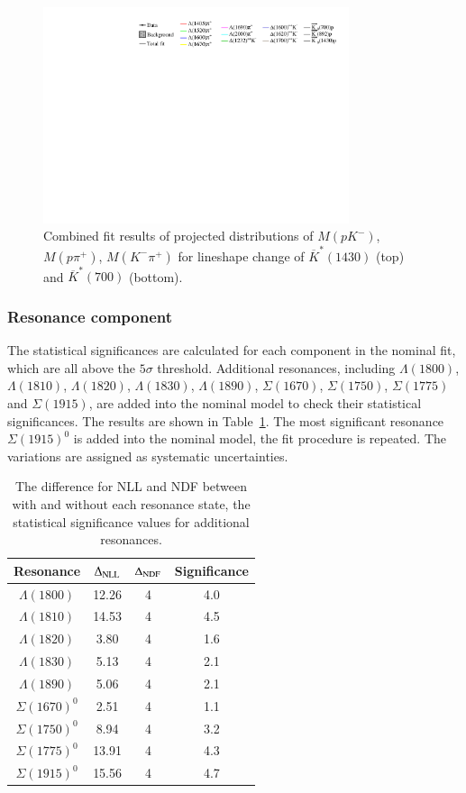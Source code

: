 \begin{figure}[htbp]
    \includegraphics[width=0.80\textwidth]{figure/pwa_nominal/legend.pdf}

    \caption{Combined fit results of projected distributions of $M(pK^-)$, $M(p\pi^+)$, $M(K^-\pi^+)$ for lineshape change of $\overline{K}^*(1430)$ (top) and $\overline{K}^*(700)$ (bottom). }
\label{fig:pwa_lineshape}
\end{figure}

\subsubsection{Resonance component}
\label{sec:syst_component}
The statistical significances are calculated for each component in the nominal fit, which are all above the $5\sigma$ threshold. Additional resonances, including $\Lambda(1800)$, $\Lambda(1810)$, $\Lambda(1820)$, $\Lambda(1830)$, $\Lambda(1890)$, $\Sigma(1670)$, $\Sigma(1750)$, $\Sigma(1775)$ and $\Sigma(1915)$, are added into the nominal model to check their statistical significances. The results are shown in Table~\ref{tab:add_significance}. The most significant resonance $\Sigma(1915)^0$ is added into the nominal model, the fit procedure is repeated. The variations are assigned as systematic uncertainties. 
\begin{table}[h]
    \centering
    \caption{The difference for NLL and NDF between with and without each resonance state, the statistical significance values for additional resonances.}
    \label{tab:add_significance}
    \begin{tabular}{cccc}
        \hline\hline
    Resonance & $\Delta_{\rm NLL}$ & $\Delta_{\rm NDF}$ & Significance \\\hline
    $\Lambda(1800)$ & 12.26 & 4 & 4.0\\
    $\Lambda(1810)$ & 14.53 & 4 & 4.5\\
    $\Lambda(1820)$ & 3.80 & 4 & 1.6\\
    $\Lambda(1830)$ & 5.13 & 4 & 2.1\\
    $\Lambda(1890)$ & 5.06 & 4 & 2.1\\
    $\Sigma(1670)^{0}$ & 2.51 & 4 & 1.1\\
    $\Sigma(1750)^{0}$ & 8.94 & 4 & 3.2\\
    $\Sigma(1775)^{0}$ & 13.91 & 4 & 4.3\\
    $\Sigma(1915)^{0}$ & 15.56 & 4 & 4.7\\
    \hline\hline
    \end{tabular}
\end{table}

